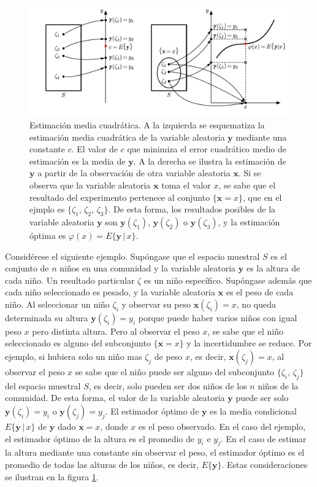 \documentclass[a4paper]{report}
\newcommand{\x}{\mathbf{x}}
\newcommand{\y}{\mathbf{y}}
\begin{document}
\begin{figure}[!htb]
\begin{center}
\includegraphics[width=0.97\columnwidth]{figuras/mean_square_estimation_scheme.pdf}
\caption{\label{fig:mean_square_estimation_scheme} Estimación media cuadrática. A la izquierda se esquematiza la estimación media cuadrática de la variable aleatoria \(\y\) mediante una constante \(c\). El valor de \(c\) que minimiza el error cuadrático medio de estimación es la media de \(\y\). A la derecha se ilustra la estimación de \(\y\) a partir de la observación de otra variable aleatoria \(\x\). Si se observa que la variable aleatoria \(\x\) toma el valor \(x\), se sabe que el resultado del experimento pertenece al conjunto \(\{\x=x\}\), que en el ejmplo es \(\{\zeta_1,\,\zeta_2,\,\zeta_3\}\). De esta forma, los resultados posibles de la variable aleatoria \(\y\) son \(\y(\zeta_1)\), \(\y(\zeta_2)\) o \(\y(\zeta_3)\), y la estimación óptima es \(\varphi(x)=E\{\y\,|\,x\}\).}
\end{center}
\end{figure}

Considérese el siguiente ejemplo. Supóngase que el espacio muestral \(S\) es el conjunto de \(n\) niños en una comunidad y la variable aleatoria \(\y\) es la altura de cada niño. Un resultado particular \(\zeta\) es un niño específico. Supóngase además que cada niño seleccionado es pesado, y la variable aleatoria \(\x\) es el peso de cada niño. Al seleccionar un niño \(\zeta_i\) y observar su peso \(\x(\zeta_i)=x\), no queda determinada su altura \(\y(\zeta_i)=y_i\) porque puede haber varios niños con igual peso \(x\) pero distinta altura. Pero al observar el peso \(x\), se sabe que el niño seleccionado es alguno del subconjunto \(\{\x=x\}\) y la incertidumbre se reduce. Por ejemplo, si hubiera solo un niño mas \(\zeta_j\) de peso \(x\), es decir, \(\x(\zeta_j)=x\), al observar el peso \(x\) se sabe que el niño puede ser alguno del subconjunto \(\{\zeta_i,\,\zeta_j\}\) del espacio muestral \(S\), es decir, solo pueden ser dos niños de los \(n\) niños de la comunidad. De esta forma, el valor de la variable aleatoria \(\y\) puede ser solo \(\y(\zeta_i)=y_i\) o \(\y(\zeta_j)=y_j\). El estimador óptimo de \(\y\) es la media condicional \(E\{\y\,|\,x\}\) de \(\y\) dado \(\x=x\), donde \(x\) es el peso observado. En el caso del ejemplo, el estimador óptimo de la altura es el promedio de \(y_i\) e \(y_j\). En el caso de estimar la altura mediante una constante sin observar el peso, el estimador óptimo es el promedio de todas las alturas de los niños, es decir, \(E\{\y\}\). Estas consideraciones se ilustran en la figura \ref{fig:mean_square_estimation_scheme}.
\end{document}
